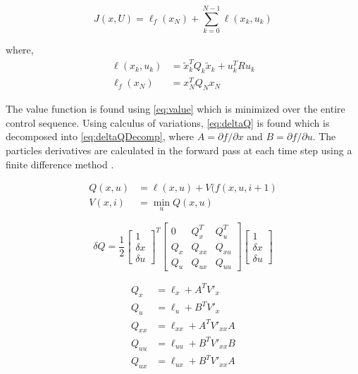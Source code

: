 \begin{equation}
    J(x,U) = \ell_f (x_N) + \sum_{k=0}^{N-1} \ell(x_k, u_k) 
    \label{eq:cost}
\end{equation}

where,
\begin{equation}
    \begin{split}
            \ell(x_k, u_k) &= \tilde{x}_k^T Q_k \tilde{x}_k + u_k^T R u_k \\
    \ell_f(x_N) &= x^{T}_{N} Q_N x_{N}
    \end{split}
      \label{eq:mycost}
\end{equation}

The value function is found using \autoref{eq:value} which is minimized over the entire control sequence. Using calculus of variations, \autoref{eq:deltaQ} is found which is decomposed into  \autoref{eq:deltaQDecomp}, where $ A =\partial f / \partial x$ and  $B = \partial f / \partial u$. The particles derivatives are calculated in the forward pass at each time step using a finite difference method \cite{iLQR_Zachary2016}. 


\begin{equation}
    \begin{split}
        Q(x,u) &= \ell (x,u) + V(f(x,u,i+1) \\
        V(x,i) &= \min\limits_{u} Q(x,u)
    \end{split}
    \label{eq:value}
\end{equation}


\begin{equation}
     \delta Q = 
     \frac{1}{2}
     \begin{bmatrix}
     1 \\
     \delta x \\
     \delta u
     \end{bmatrix}^T
       \begin{bmatrix}
        0       & Q^T_{x} & Q^T_{u}  \\
        Q_{x}   & Q_{xx} & Q_{xu}  \\
        Q_{u}   & Q_{ux} & Q_{uu} 
    \end{bmatrix}
    \begin{bmatrix}
     1 \\
     \delta x \\
     \delta u
     \end{bmatrix}
        \label{eq:deltaQ}
\end{equation}

\begin{equation}
    \begin{split}
        Q_x &= \ell_x + A^T V'_x \\
        Q_u &= \ell_u + B^T V'_x \\
        Q_{xx} &= \ell_{xx} + A^T V'_{xx}A \\
        Q_{uu} &= \ell_{uu} + B^T V'_{xx}B \\
        Q_{ux} &= \ell_{ux} + B^T V'_{xx}A \\
    \end{split}
    \label{eq:deltaQDecomp}
\end{equation}



